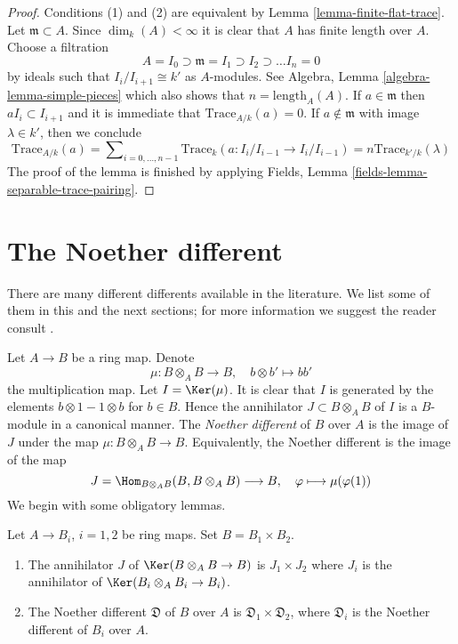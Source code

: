 \begin{proof}
Conditions (1) and (2) are equivalent by Lemma \ref{lemma-finite-flat-trace}.
Let $\mathfrak m \subset A$. Since $\dim_k(A) < \infty$ it is clear that
$A$ has finite length over $A$. Choose a filtration
$$
A = I_0 \supset \mathfrak m = I_1 \supset I_2 \supset \ldots I_n = 0
$$
by ideals such that $I_i/I_{i + 1} \cong k'$ as $A$-modules. See
Algebra, Lemma \ref{algebra-lemma-simple-pieces} which also shows that
$n = \text{length}_A(A)$. If $a \in \mathfrak m$ then $aI_i \subset I_{i + 1}$
and it is immediate that $\text{Trace}_{A/k}(a) = 0$.
If $a \not \in \mathfrak m$ with image $\lambda \in k'$, then
we conclude
$$
\text{Trace}_{A/k}(a) =
\sum\nolimits_{i = 0, \ldots, n - 1}
\text{Trace}_k(a : I_i/I_{i - 1} \to I_i/I_{i - 1}) =
n \text{Trace}_{k'/k}(\lambda)
$$
The proof of the lemma is finished by applying
Fields, Lemma \ref{fields-lemma-separable-trace-pairing}.
\end{proof}



\section{The Noether different}
\label{section-noether-different}

\noindent
There are many different differents available in the literature.
We list some of them in this and the next sections; for more
information we suggest the reader consult \cite{Kunz}.

\medskip\noindent
Let $A \to B$ be a ring map. Denote
$$
\mu : B \otimes_A B \longrightarrow B,\quad
b \otimes b' \longmapsto bb'
$$
the multiplication map. Let $I = \Ker(\mu)$. It is clear that $I$ is
generated by the elements $b \otimes 1 - 1 \otimes b$ for $b \in B$.
Hence the annihilator $J \subset B \otimes_A B$ of $I$ is a $B$-module
in a canonical manner. The {\it Noether different} of $B$ over $A$ is
the image of $J$ under the map $\mu : B \otimes_A B \to B$. Equivalently,
the Noether different is the image of the map
$$
J = \Hom_{B \otimes_A B}(B, B \otimes_A B) \longrightarrow B,\quad
\varphi \longmapsto \mu(\varphi(1))
$$
We begin with some obligatory lemmas.

\begin{lemma}
\label{lemma-noether-different-product}
Let $A \to B_i$, $i = 1, 2$ be ring maps. Set $B = B_1 \times B_2$.
\begin{enumerate}
\item The annihilator $J$ of $\Ker(B \otimes_A B \to B)$ is $J_1 \times J_2$
where $J_i$ is the annihilator of $\Ker(B_i \otimes_A B_i \to B_i)$.
\item The Noether different $\mathfrak{D}$ of $B$ over $A$ is
$\mathfrak{D}_1 \times \mathfrak{D}_2$, where $\mathfrak{D}_i$ is
the Noether different of $B_i$ over $A$.
\end{enumerate}
\end{lemma}

